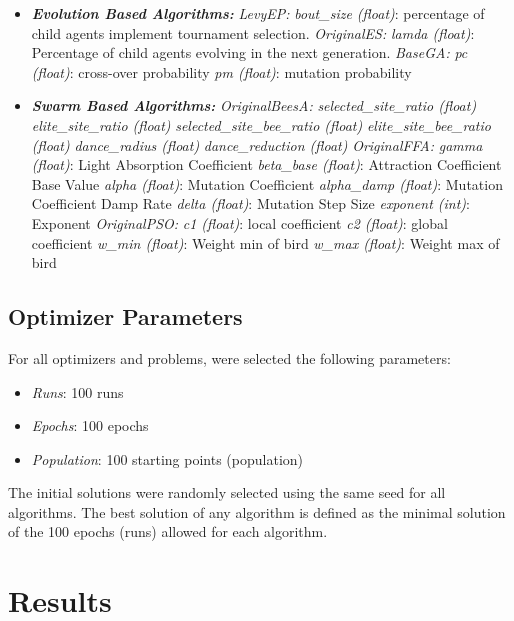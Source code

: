 \documentclass[conference]{IEEEtran}
\begin{document}
\begin{itemize}
    \item \textit{\textbf{Evolution Based Algorithms: }}
        \subitem \textit{LevyEP:}
            \subsubitem \textit{bout\_size (float)}: percentage of child agents implement tournament selection.
        \subitem \textit{OriginalES:}
            \subsubitem \textit{lamda (float)}: Percentage of child agents evolving in the next generation.
        \subitem \textit{BaseGA:}
            \subsubitem \textit{pc (float)}: cross-over probability
            \subsubitem \textit{pm (float)}: mutation probability
    \item \textit{\textbf{Swarm Based Algorithms: }}
        \subitem \textit{OriginalBeesA:}
            \subsubitem \textit{selected\_site\_ratio (float)}
            \subsubitem \textit{elite\_site\_ratio (float)}
            \subsubitem \textit{selected\_site\_bee\_ratio (float)}
            \subsubitem \textit{elite\_site\_bee\_ratio (float)}
            \subsubitem \textit{dance\_radius (float)}
            \subsubitem \textit{dance\_reduction (float)}
        \subitem \textit{OriginalFFA:}
            \subsubitem \textit{gamma (float)}: Light Absorption Coefficient
            \subsubitem \textit{beta\_base (float)}: Attraction Coefficient Base Value
            \subsubitem \textit{alpha (float)}: Mutation Coefficient
            \subsubitem \textit{alpha\_damp (float)}: Mutation Coefficient Damp Rate
            \subsubitem \textit{delta (float)}: Mutation Step Size
            \subsubitem \textit{exponent (int)}: Exponent
        \subitem \textit{OriginalPSO:}
            \subsubitem \textit{c1 (float)}: local coefficient
            \subsubitem \textit{c2 (float)}: global coefficient
            \subsubitem \textit{w\_min (float)}: Weight min of bird
            \subsubitem \textit{w\_max (float)}: Weight max of bird

\end{itemize}

\subsection{Optimizer Parameters}
\label{subsec:methodology-optimizer-parameters}

For all optimizers and problems, were selected the following parameters:

\begin{itemize}
    \item \textit{Runs}: 100 runs
    \item \textit{Epochs}: 100 epochs
    \item \textit{Population}: 100 starting points (population)
\end{itemize}

The initial solutions were randomly selected using the same seed for all algorithms.
The best solution of any algorithm is defined as the minimal solution of the 100 epochs (runs)
allowed for each algorithm.

\section{Results}
\label{sec:results}
\end{document}
